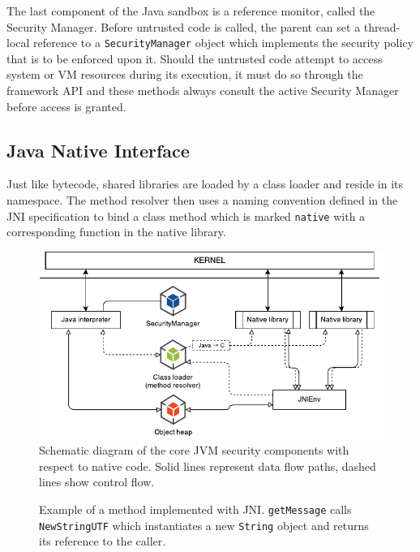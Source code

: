 \documentclass[a4paper,12pt,twoside,openright]{report}
\begin{document}
The last component of the Java sandbox is a reference monitor, called the Security Manager. Before untrusted code is called, the parent can set a thread-local reference to a \texttt{SecurityManager} object which implements the security policy that is to be enforced upon it. Should the untrusted code attempt to access system or VM resources during its execution, it must do so through the framework API and these methods always consult the active Security Manager before access is granted.

\subsection{Java Native Interface}

Just like bytecode, shared libraries are loaded by a class loader and reside in its namespace. The method resolver then uses a naming convention defined in the JNI specification to bind a class method which is marked \texttt{native} with a corresponding function in the native library.

\begin{figure}
	\includegraphics[width=\textwidth]{dia_jni_orig.pdf}
	\caption{Schematic diagram of the core JVM security components with respect to native code. Solid lines represent data flow paths, dashed lines show control flow.}
	\label{fig:OverviewJNI}
\end{figure}

\begin{figure}[t]
	
	
	\caption{Example of a method implemented with JNI. \texttt{getMessage} calls \texttt{NewStringUTF} which instantiates a new \texttt{String} object and returns its reference to the caller.}
	\label{listing:HelloJNI}
\end{figure}
\end{document}

